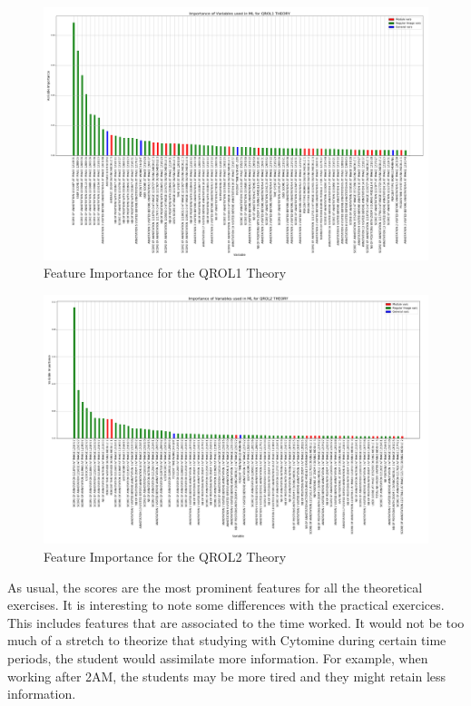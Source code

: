 \documentclass[a4paper,11pt]{report}
\numberwithin{figure}{chapter} %
\begin{document}
      \begin{figure}[H]
      \centering
      \includegraphics[width=.95\linewidth]{plots/var_importance_QROL1_THEORY_2018-05-02_20_54_23.png}
      \caption{Feature Importance for the QROL1 Theory}
      \label{fig:var_th2}
      \end{figure}

      \begin{figure}[H]
      \centering
      \includegraphics[width=.95\linewidth]{plots/var_importance_QROL2_THEORY_2018-05-02_20_53_44.png}
      \caption{Feature Importance for the QROL2 Theory}
      \label{fig:var_th3}
      \end{figure}

    As usual, the scores are the most prominent features for all the theoretical exercises.
    It is interesting to note some differences with the practical exercices.
    This includes features that are associated to the time worked.
    It would not be too much of a stretch to theorize that studying with Cytomine during certain time periods, the student would assimilate more information.
    For example, when working after 2AM, the students may be more tired and they might retain less information.\\
\end{document}
